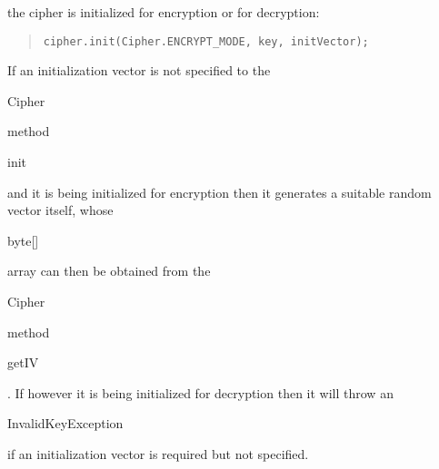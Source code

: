 the cipher is initialized for encryption or for
decryption:
\begin{quote}\begin{code}\begin{verbatim}
cipher.init(Cipher.ENCRYPT_MODE, key, initVector);
\end{verbatim}\end{code}\end{quote}
If an initialization vector is not specified to the \begin{code}Cipher\end{code}
method \begin{code}init\end{code} and it is being initialized for encryption
then it generates a suitable random vector itself, whose \begin{code}byte[]\end{code} array
can then be obtained from the \begin{code}Cipher\end{code}
method \begin{code}getIV\end{code}. If however it is being initialized for
decryption then it will throw an \begin{code}InvalidKeyException\end{code}
if an initialization vector is required but not specified.

